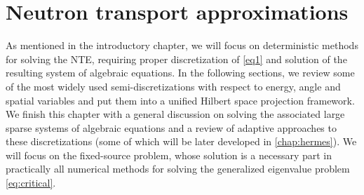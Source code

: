 \ifpdf
	\graphicspath{{3/pic/PNG/}{3/pic/PDF/}{3/pic/}}
\else
	\graphicspath{{3/pic/EPS/}{3/pic/}}
\fi

\chapter{Neutron transport approximations}\label{chap:nte-methods}

As mentioned in the introductory chapter, we will focus on deterministic methods for solving the NTE, requiring proper
discretization of \eqref{eq1} and solution of the resulting system of algebraic equations.
In the following sections, we review some of the most widely used semi-discretizations with respect to energy, angle and
spatial variables and put them into a unified Hilbert space projection framework. We finish this chapter with a general
discussion on solving the associated large sparse systems of algebraic equations and a review of adaptive approaches to
these discretizations (some of which will be later developed in \cref{chap:hermes}). We will focus on the fixed-source
problem, whose solution is a necessary part in practically all numerical methods for solving the generalized eigenvalue
problem \eqref{eq:critical}.

